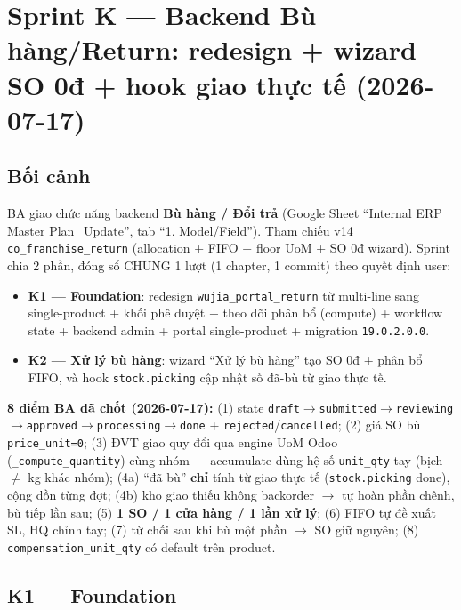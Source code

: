\chapter{Sprint K --- Backend Bù hàng/Return: redesign + wizard SO 0đ + hook giao thực tế (2026-07-17)}

\section{Bối cảnh}

BA giao chức năng backend \textbf{Bù hàng / Đổi trả} (Google Sheet ``Internal ERP Master Plan\_Update'',
tab ``1. Model/Field''). Tham chiếu v14 \texttt{co\_franchise\_return} (allocation + FIFO + floor UoM +
SO 0đ wizard). Sprint chia 2 phần, đóng sổ CHUNG 1 lượt (1 chapter, 1 commit) theo quyết định user:
\begin{itemize}
  \item \textbf{K1 --- Foundation}: redesign \texttt{wujia\_portal\_return} từ multi-line sang
    single-product + khối phê duyệt + theo dõi phân bổ (compute) + workflow state + backend admin
    + portal single-product + migration \texttt{19.0.2.0.0}.
  \item \textbf{K2 --- Xử lý bù hàng}: wizard ``Xử lý bù hàng'' tạo SO 0đ + phân bổ FIFO, và hook
    \texttt{stock.picking} cập nhật số đã-bù từ giao thực tế.
\end{itemize}

\textbf{8 điểm BA đã chốt (2026-07-17):} (1) state \texttt{draft$\to$submitted$\to$reviewing$\to$approved$\to$processing$\to$done}
+ \texttt{rejected}/\texttt{cancelled}; (2) giá SO bù \texttt{price\_unit=0}; (3) ĐVT giao quy đổi qua
engine UoM Odoo (\texttt{\_compute\_quantity}) cùng nhóm --- accumulate dùng hệ số \texttt{unit\_qty} tay
(bịch $\neq$ kg khác nhóm); (4a) ``đã bù'' \textbf{chỉ} tính từ giao thực tế (\texttt{stock.picking} done),
cộng dồn từng đợt; (4b) kho giao thiếu không backorder $\to$ tự hoàn phần chênh, bù tiếp lần sau;
(5) \textbf{1 SO / 1 cửa hàng / 1 lần xử lý}; (6) FIFO tự đề xuất SL, HQ chỉnh tay; (7) từ chối sau khi
bù một phần $\to$ SO giữ nguyên; (8) \texttt{compensation\_unit\_qty} có default trên product.

\section{K1 --- Foundation}

